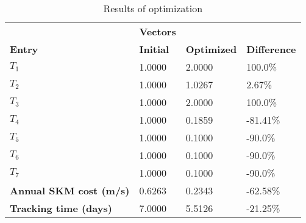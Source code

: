 \begin{table}[H]
\centering
\begin{tabular}{llll}
\textbf{}      & \cellcolor[HTML]{EFEFEF}\textbf{Vectors} & \textbf{} & \textbf{}         \\
\rowcolor[HTML]{EFEFEF} 
\textbf{Entry} & \textbf{Initial} & \textbf{Optimized} & \textbf{Difference} \\
$T_1$ & 1.0000 & 2.0000 & 100.0\% \\ 
$T_2$ & 1.0000 & 1.0267 & 2.67\% \\ 
$T_3$ & 1.0000 & 2.0000 & 100.0\% \\ 
$T_4$ & 1.0000 & 0.1859 & -81.41\% \\ 
$T_5$ & 1.0000 & 0.1000 & -90.0\% \\ 
$T_6$ & 1.0000 & 0.1000 & -90.0\% \\ 
$T_7$ & 1.0000 & 0.1000 & -90.0\% \\ 
\rowcolor[HTML]{EFEFEF} 
\textbf{Annual SKM cost (m/s)}  & 0.6263 & 0.2343 & -62.58\% \\ 
\rowcolor[HTML]{EFEFEF} 
\textbf{Tracking time (days)}  & 7.0000 & 5.5126 & -21.25\% \\ 
\end{tabular}
\caption{Results of optimization}
\label{tab:OptimizationAnalysis}
\end{table}